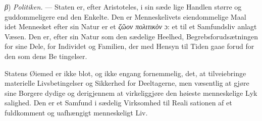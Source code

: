 \documentclass[12pt,a4paper]{book}
\newcommand{\gk}[1]{\textit{#1}}
\begin{document}
\gk{β}) \emph{Politiken.} --- Staten er, efter Aristoteles, i sin sæde\-%
lige Handlen større og guddommeligere end den Enkelte. Den
er Menneskelivets eiendommelige Maal idet Mennesket efter
sin Natur er et \gk{ζῶον πολιτικὸν} ɔ: et til et Samfundsliv anlagt
Væsen. Den er, efter sin Natur som den sædelige Heelhed,
Begrebsforudsætningen for sine Dele, for Individet og Familien,
der med Hensyn til Tiden gaae forud for den som dens Be\-%
tingelser.

Statens Øiemed er ikke blot, og ikke engang fornemmelig,
det, at tilveiebringe materielle Livsbetingelser og Sikkerhed for
Deeltagerne, men væsentlig at gjøre sine Borgere dydige og
derigjennem at virkeliggjøre den høieste menneskelige Lyk\-%
salighed. Den er et Samfund i sædelig Virksomhed til Reali\-%
sationen af et fuldkomment og uafhængigt menneskeligt Liv.
\end{document}
